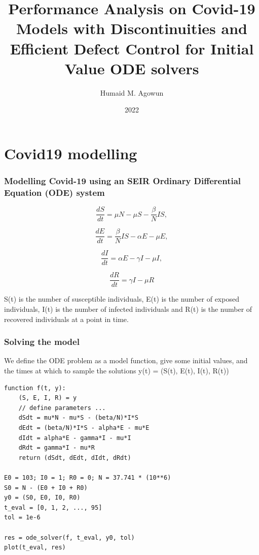 \documentclass{beamer}
\title{Performance Analysis on Covid-19 Models with Discontinuities and Efficient Defect Control for Initial Value ODE solvers}
\author{Humaid M. Agowun}
\institute{Saint Mary's University}
\date{2022}
\begin{document}
\frame{\titlepage}


\section{Covid19 modelling}
\begin{frame}
\frametitle{Modelling Covid-19 using an SEIR Ordinary Differential Equation (ODE) system}

\begin{equation}
\frac{\textit{d}S}{\textit{dt}} = \mu N - \mu S - \frac{\beta}{N}IS, \nonumber
\end{equation}

\begin{equation}
\frac{\textit{d}E}{\textit{dt}} = \frac{\beta}{N}IS - \alpha E - \mu E, \nonumber
\end{equation}

\begin{equation}
\frac{\textit{d}I}{\textit{dt}} = \alpha E - \gamma I - \mu I, \nonumber
\end{equation}

\begin{equation}
\frac{\textit{d}R}{\textit{dt}} = \gamma I - \mu R \nonumber
\end{equation} 

S(t) is the number of susceptible individuals, 
E(t) is the number of exposed individuals, 
I(t) is the number of infected individuals and 
R(t) is the number of recovered individuals at a point in time. 
\end{frame}

\begin{frame}[fragile]
\frametitle{Solving the model}
We define the ODE problem as a model function, give some initial values, and the times at which to sample the solutions y(t) = (S(t), E(t), I(t), R(t))

\begin{lstlisting}
function f(t, y):
    (S, E, I, R) = y
    // define parameters ...
    dSdt = mu*N - mu*S - (beta/N)*I*S
    dEdt = (beta/N)*I*S - alpha*E - mu*E
    dIdt = alpha*E - gamma*I - mu*I
    dRdt = gamma*I - mu*R
    return (dSdt, dEdt, dIdt, dRdt)

E0 = 103; I0 = 1; R0 = 0; N = 37.741 * (10**6)
S0 = N - (E0 + I0 + R0)
y0 = (S0, E0, I0, R0)
t_eval = [0, 1, 2, ..., 95]
tol = 1e-6

res = ode_solver(f, t_eval, y0, tol)
plot(t_eval, res)
\end{lstlisting}
\end{frame}
\end{document}
